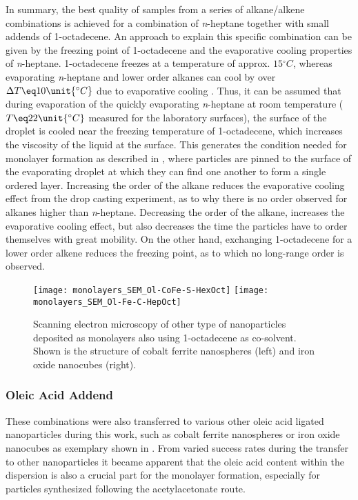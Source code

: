 \documentclass[\main/dresen_thesis.tex]{subfiles}
\begin{document}
    In summary, the best quality of samples from a series of alkane/alkene combinations is achieved for a combination of \textit{n}-heptane together with small addends of 1-octadecene.
    An approach to explain this specific combination can be given by the freezing point of 1-octadecene and the evaporative cooling properties of \textit{n}-heptane.
    1-octadecene freezes at a temperature of approx. $15 \unit{^\circ C}$, whereas evaporating \textit{n}-heptane and lower order alkanes can cool by over $\Delta T \eq 10 \unit{^\circ C}$ due to evaporative cooling \cite{Tuckermann_2002_Evapo}.
    Thus, it can be assumed that during evaporation of the quickly evaporating \textit{n}-heptane at room temperature ($T \eq 22 \unit{^\circ C}$ measured for the laboratory surfaces), the surface of the droplet is cooled near the freezing temperature of 1-octadecene, which increases the viscosity of the liquid at the surface.
    This generates the condition needed for monolayer formation as described in \cite{Bigioni_2006_Kinet}, where particles are pinned to the surface of the evaporating droplet at which they can find one another to form a single ordered layer.
    Increasing the order of the alkane reduces the evaporative cooling effect from the drop casting experiment, as to why there is no order observed for alkanes higher than \textit{n}-heptane.
    Decreasing the order of the alkane, increases the evaporative cooling effect, but also decreases the time the particles have to order themselves with great mobility.
    On the other hand, exchanging 1-octadecene for a lower order alkene reduces the freezing point, as to which no long-range order is observed.

    \begin{figure}[tb]
      \centering
      \texttt{[image: monolayers\_SEM\_Ol-CoFe-S-HexOct]}
      \texttt{[image: monolayers\_SEM\_Ol-Fe-C-HepOct]}
      \caption{\label{fig:monolayers:preparation:solventVariation:spheresIron}Scanning electron microscopy of other type of nanoparticles deposited as monolayers also using 1-octadecene as co-solvent. Shown is the structure of cobalt ferrite nanospheres (left) and iron oxide nanocubes (right).}
    \end{figure}

  \subsubsection{Oleic Acid Addend}
    These combinations were also transferred to various other oleic acid ligated nanoparticles during this work, such as cobalt ferrite nanospheres or iron oxide nanocubes as exemplary shown in .
    From varied success rates during the transfer to other nanoparticles it became apparent that the oleic acid content within the dispersion is also a crucial part for the monolayer formation, especially for particles synthesized following the acetylacetonate route.
\end{document}
